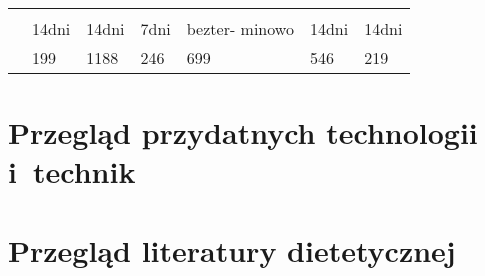 \begin{minipage}{\textwidth}
\begin{table}[H]
\begin{tabular}{|P{.22\textwidth}|P{.09\textwidth}|P{.09\textwidth}|P{.09\textwidth}|P{.09\textwidth}|P{.09\textwidth}|P{.09\textwidth}|}
                  &        &            &           &             &        &      \\ \hline
                   &        &            &           &             &        &      \\ \hline
                           & 14dni     & 14dni         & 7dni         & bezter- minowo & 14dni     & 14dni   \\ \hline
                      & 199       & 1188          & 246          & 699            & 546       & 219     \\ \hline
        \end{tabular}
    \end{table}
\end{minipage}

\section{Przegląd przydatnych technologii i~technik}\label{sec:usefull-technologies}

\section{Przegląd literatury dietetycznej}\label{sec:domain-literature}

\thispagestyle{normal}

